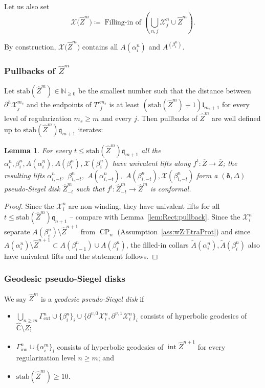 \documentclass{amsart}
\newcommand{\1}{{\mathbb 1 }}
\newcommand{\ext}{{\operatorname{ext}}}
\newcommand{\stab}{{\text{stab}}}
\newcommand{\bDelta}{{\mathbb{\Delta}}}
\newcommand\XX{\mathcal{X}}
\newcommand\intr{\operatorname{int}}
\newcommand{\wZ}{{\widehat Z}}
\newcommand{\qq}{\mathfrak{q}}
\newcommand{\length}{{\mathfrak l}}
\newcommand\inn{{\operatorname{inn}}}
\newcommand{\wC}{\widehat{\mathbb{C}}}
\newcommand{\N}{\mathbb{N}}
\newtheorem{lem}[thm]{Lemma}
\theoremstyle{remark}
\numberwithin{equation}{section}
\theoremstyle{definition}
\newcommand{\CP}{{\operatorname{CP}}}
\newcommand{\bdelta}{{\boldsymbol{ \delta}}}
\begin{document}
Let us also set
\begin{equation}
\label{eq:dfn XX(wZ)}
\XX\big(\wZ^m\big)\coloneqq \operatorname{Filling-in~of }\left(\bigcup_{n,j}\XX^n_j \cup \wZ^m \right).
\end{equation} 

By construction, $\XX\big(\wZ^m\big)$ contains all $A(\alpha^n_i)$ and $A^(\beta^n_i)$.

 
\subsubsection{Pullbacks of $\wZ^m$} 
\label{sss:Pullbacks of wZ^m}Let $\stab(\wZ^m)\in \N_{\ge 0}$ be the smallest number such that the distance between $\partial^h \XX^{m_s}_j$ and the endpoints of $T'^{m_s}_j$ is at least $(\stab(\wZ^m)+1)\length_{m_s+1}$ for every level of regularization $m_s\ge m$ and every $j$. Then pullbacks of $\wZ^m$ are well defined up to $\stab(\wZ^m)\qq_{m+1}$ iterates:

\begin{lem}
\label{lem:Pullback of wZ^m}
For every $t\le \stab(\wZ^m) \qq_{m+1}$ all the $\alpha^n_i,\beta^n_i,A(\alpha^n_i),A(\beta^n_i), \XX(\beta^n_i)$ have univalent lifts along $f^t\colon \overline Z\to \overline Z$; the resulting lifts $\alpha^n_{i,-t},$ $\beta^n_{i,-t},$ $A(\alpha^n_{i,-t}),$ $A(\beta^n_{i,-t}), \XX(\beta^n_{i,-t})$ form a $(\bdelta,\bDelta)$ pseudo-Siegel disk $\wZ^m_{-t}$ such that $f^t\colon \wZ^m_{-t}\to \wZ^m$ is conformal.
\end{lem}
\begin{proof}
Since the $\XX^n_i$ are non-winding, they have univalent lifts for all $t\le  \stab(\wZ^m)  \qq_{n+1}$ -- compare with Lemma~\ref{lem:Rect:pullback}.  Since the $\XX^n_i$ separate $A(\beta^n_i)\setminus \wZ^{n+1}$ from $\CP_n$ (Assumption~\ref{ass:wZ:EtraProt}) and since $A(\alpha^n_i)\setminus \wZ^{n+1}\subset A(\beta^n_{i-1})\cup A(\beta^n_{i})$,  the filled-in collars $\widetilde A(\alpha^n_i),\widetilde A(\beta^n_i)$ also have univalent lifts and the statement follows.
\end{proof}






\subsubsection{Geodesic pseudo-Siegel disks}\label{sss:regul within rect}  
We say $\wZ^m$ is a \emph{geodesic pseudo-Siegel disk} if 
\begin{itemize}
\item $\bigcup_{n\ge m} \Gamma^n_\ext\cup \{\beta^n_i\}_i\cup \{ \partial^{v, 0}\XX^n_i, \partial^{v,1}\XX^n_i \}_i$ consists of hyperbolic geodesics of $\wC\setminus  \overline Z$;
\item $\Gamma^n_\inn\cup \{\alpha^m_i\}_i $ consists of hyperbolic geodesics of $\intr \wZ^{n+1}$ for every regularization level $n\ge m$; and
\item $\stab(\wZ^m)\ge 10$. 
\end{itemize}
\end{document}
